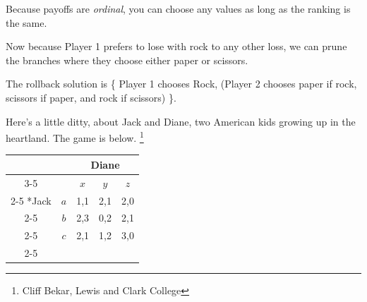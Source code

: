 \documentclass[addpoints ]{exam}
\begin{document}
\begin{questions}
\begin{solution}
  Because payoffs are \textit{ordinal}, 
  you can choose any values as long as the ranking is the same.

  Now because Player 1 prefers to lose with rock to any other loss, 
  we can prune the branches where they choose either 
  paper or scissors.
  
  The rollback solution is 
  \{ Player 1 chooses Rock, 
  (Player 2 chooses paper if rock,
  scissors if paper,
  and rock if scissors) \}.
   
\end{solution}

\newpage


\question%
Here's a little ditty, about Jack and Diane,
two American kids growing up in the heartland.
The game is below.
\footnote{Cliff Bekar, Lewis and Clark College}

  \begin{table}[h!]
    \centering
    \setlength{\extrarowheight}{2pt}
    \begin{tabular}{*{5}{c|}}
      \multicolumn{2}{c}{} & \multicolumn{3}{c}{Diane} \\\cline{3-5}
      \multicolumn{1}{c}{} &     & $x$ & $y$ & $z$ \\\cline{2-5}
      \multirow{3}*{Jack}  & $a$ & 1,1 & 2,1 & 2,0 \\\cline{2-5}
                           & $b$ & 2,3 & 0,2 & 2,1 \\\cline{2-5}
                           & $c$ & 2,1 & 1,2 & 3,0 \\\cline{2-5}
    \end{tabular}
  \end{table}



\end{questions}
\end{document}
